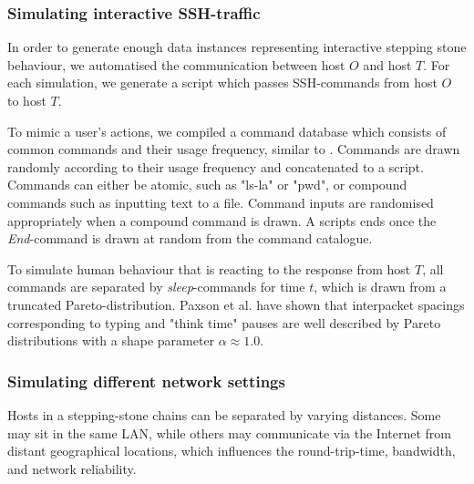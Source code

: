 \documentclass[runningheads,11pt]{llncs}\usepackage[]{graphicx}\usepackage[]{color}
\begin{document}
\subsubsection{Simulating interactive SSH-traffic}\label{Sec:Simulating_interactive}

In order to generate enough data instances representing interactive stepping stone behaviour, we automatised the communication between host $O$ and host $T$. For each simulation, we generate a script which passes SSH-commands from host $O$ to host $T$.%

To mimic a user's actions, we compiled a command database which consists of common commands and their usage frequency, similar to \cite{xin2006testbed}.%
Commands are drawn randomly according to their usage frequency and concatenated to a script. 
Commands can either be atomic, such as "ls-la" or "pwd", or compound commands such as inputting text to a file.
Command inputs are randomised appropriately when a compound command is drawn. A scripts ends once the \textit{End}-command is drawn at random from the command catalogue. 


To simulate human behaviour that is reacting to the response from host $T$, all commands are separated by \textit{sleep}-commands for time $t$, which is drawn from a truncated Pareto-distribution. Paxson et al. \cite{paxson1995wide} have shown that interpacket spacings corresponding to typing and "think time" pauses are well described by Pareto distributions with a shape parameter $\alpha\approx 1.0$. %


\vspace{-0.6cm}
\subsubsection{Simulating different network settings}\label{Sec:congestion}

Hosts in a stepping-stone chains can be separated by varying distances. Some may sit in the same LAN, while others may communicate via the Internet from distant geographical locations, which influences the round-trip-time, bandwidth, and network reliability. 
\end{document}
